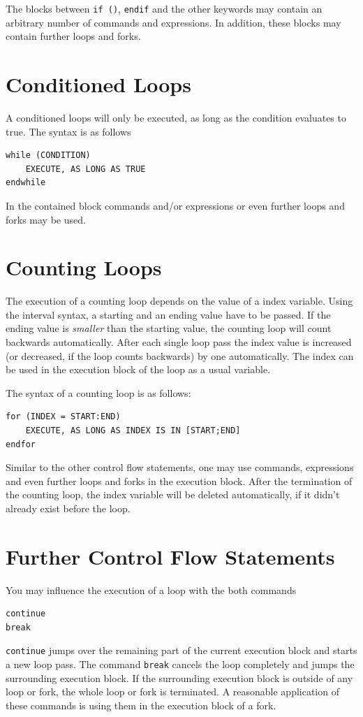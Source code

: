 \documentclass[DIV=14,headsepline,footsepline]{scrbook}
\begin{document}
				The blocks between \lstinline+if ()+, \lstinline+endif+ and the other keywords may contain an arbitrary number of commands and expressions. In addition, these blocks may contain further loops and forks.
				
			\section{Conditioned Loops}
				A conditioned loops will only be executed, as long as the condition evaluates to true. The syntax is as follows
				\begin{lstlisting}
while (CONDITION)
	EXECUTE, AS LONG AS TRUE
endwhile
				\end{lstlisting}
				In the contained block commands and/or expressions or even further loops and forks may be used.
				
			\section{Counting Loops}
				The execution of a counting loop depends on the value of a index variable. Using the interval syntax, a starting and an ending value have to be passed. If the ending value is \emph{smaller} than the starting value, the counting loop will count backwards automatically. After each single loop pass the index value is increased (or decreased, if the loop counts backwards) by one automatically. The index can be used in the execution block of the loop as a usual variable.
				
				The syntax of a counting loop is as follows:
				\begin{lstlisting}
for (INDEX = START:END)
	EXECUTE, AS LONG AS INDEX IS IN [START;END]
endfor
				\end{lstlisting}
				Similar to the other control flow statements, one may use commands, expressions and even further loops and forks in the execution block. After the termination of the counting loop, the index variable will be deleted automatically, if it didn't already exist before the loop.
				
			\section{Further Control Flow Statements}
				You may influence the execution of a loop with the both commands
				\begin{lstlisting}
continue
break
				\end{lstlisting}
				\lstinline+continue+ jumps over the remaining part of the current execution block and starts a new loop pass. The command \lstinline+break+ cancels the loop completely and jumps the surrounding execution block. If the surrounding execution block is outside of any loop or fork, the whole loop or fork is terminated. A reasonable application of these commands is using them in the execution block of a fork.
				
\end{document}
